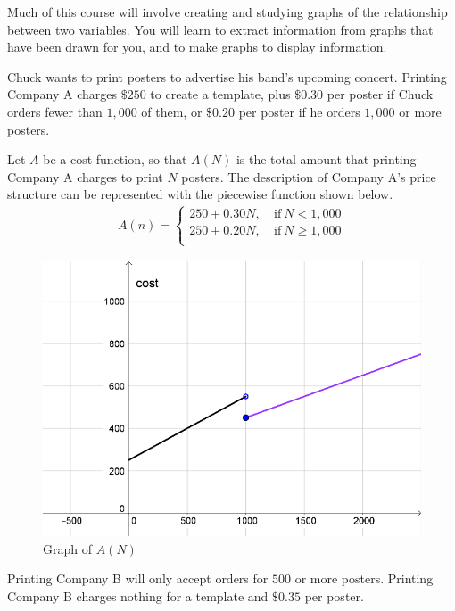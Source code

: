 \documentclass[10pt,]{book}
\theoremstyle{ptxdefinitionnotitle}
\theoremstyle{ptxdefinitiontitle}
\numberwithin{equation}{section}
\newcommand{\lt}{<}
\newcommand{\amp}{&}
\begin{document}
\par
\hypertarget{p-6}{}%
Much of this course will involve creating and studying graphs of the relationship between two variables. You will learn to extract information from graphs that have been drawn for you, and to make graphs to display information.%
\begin{example}\label{chapter02-section01-example01}
\hypertarget{p-7}{}%
Chuck wants to print posters to advertise his band's upcoming concert.  Printing Company A charges \(\$ 250\) to create a template, plus \(\$ 0.30\) per poster if Chuck orders fewer than \(1,000\) of them, or \(\$0.20\) per poster if he orders \(1,000\) or more posters.%
\par
\hypertarget{p-8}{}%
Let \(A\) be a cost function, so that \(A(N)\) is the total amount that printing Company A charges to print \(N\) posters.  The description of Company A’s price structure can be represented with the piecewise function shown below.%
%
\begin{align*}
A(n) =
\begin{cases}
250 + 0.30N, \amp  \ \text{if}  \ N \lt 1,000 \\
250 + 0.20N, \amp  \ \text{if}  \ N \geq 1,000 \\
\end{cases}
\end{align*}
\begin{figure}
\centering
\includegraphics[width=1\linewidth]{./src/images/chapter02/chapter02section01-example01-graph.png}
\caption{Graph of \(A(N)\)\label{figure-1}}
\end{figure}
\hypertarget{p-9}{}%
Printing Company B will only accept orders for \(500\) or more posters.  Printing Company B charges nothing for a template and \(\$0.35\) per poster.%

\end{example}
\end{document}
